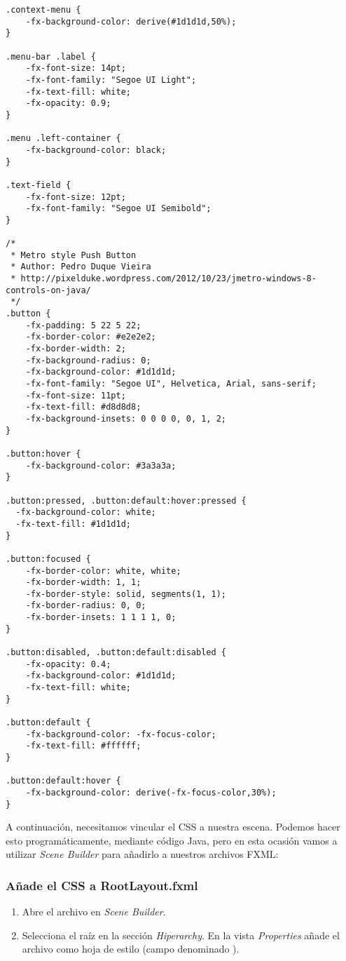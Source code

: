 \begin{verbatim}
.context-menu {
    -fx-background-color: derive(#1d1d1d,50%);
}

.menu-bar .label {
    -fx-font-size: 14pt;
    -fx-font-family: "Segoe UI Light";
    -fx-text-fill: white;
    -fx-opacity: 0.9;
}

.menu .left-container {
	-fx-background-color: black;
}

.text-field {
    -fx-font-size: 12pt;
    -fx-font-family: "Segoe UI Semibold";
}

/*
 * Metro style Push Button
 * Author: Pedro Duque Vieira
 * http://pixelduke.wordpress.com/2012/10/23/jmetro-windows-8-controls-on-java/
 */
.button {
    -fx-padding: 5 22 5 22;
    -fx-border-color: #e2e2e2;
    -fx-border-width: 2;
    -fx-background-radius: 0;
    -fx-background-color: #1d1d1d;
    -fx-font-family: "Segoe UI", Helvetica, Arial, sans-serif;
    -fx-font-size: 11pt;
    -fx-text-fill: #d8d8d8;
    -fx-background-insets: 0 0 0 0, 0, 1, 2;
}

.button:hover {
    -fx-background-color: #3a3a3a;
}

.button:pressed, .button:default:hover:pressed {
  -fx-background-color: white;
  -fx-text-fill: #1d1d1d;
}

.button:focused {
    -fx-border-color: white, white;
    -fx-border-width: 1, 1;
    -fx-border-style: solid, segments(1, 1);
    -fx-border-radius: 0, 0;
    -fx-border-insets: 1 1 1 1, 0;
}

.button:disabled, .button:default:disabled {
    -fx-opacity: 0.4;
    -fx-background-color: #1d1d1d;
    -fx-text-fill: white;
}

.button:default {
    -fx-background-color: -fx-focus-color;
    -fx-text-fill: #ffffff;
}

.button:default:hover {
    -fx-background-color: derive(-fx-focus-color,30%);
}
\end{verbatim}
A continuación, necesitamos vincular el CSS a nuestra escena. Podemos hacer esto programáticamente, 
mediante código Java, pero en esta ocasión vamos a utilizar \textit{Scene Builder} para añadirlo a 
nuestros archivos FXML:\\
\subsubsection*{Añade el CSS a RootLayout.fxml}
\begin{enumerate}
    \item Abre el archivo  en \textit{Scene Builder}.
    \item Selecciona el  raíz en la sección \textit{Hiperarchy}. En la vista \textit{Properties} añade 
    el archivo  como hoja de estilo (campo denominado ).
\end{enumerate}

